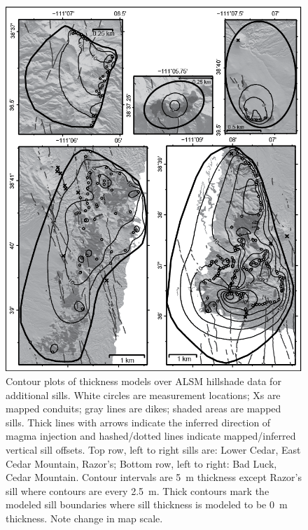 \documentclass[12pt,letter]{article}
\begin{document}
\begin{figure}[h!]
\centering
\includegraphics[width=0.7\linewidth]{figures/SFig1-5models}
\caption{Contour plots of thickness models over ALSM hillshade data for additional sills. White circles are measurement locations; Xs are mapped conduits; gray lines are dikes; shaded areas are mapped sills. Thick lines with arrows indicate the inferred direction of magma injection and hashed/dotted lines indicate mapped/inferred vertical sill offsets. Top row, left to right sills are: Lower Cedar, East Cedar Mountain, Razor's; Bottom row, left to right: Bad Luck, Cedar Mountain. Contour intervals are 5~m thickness except Razor’s sill where contours are every 2.5~m. Thick contours mark the modeled sill boundaries where sill thickness is modeled to be 0~m thickness. Note change in map scale. }
\label{fig_fivemodels}
\end{figure}
\end{document}
